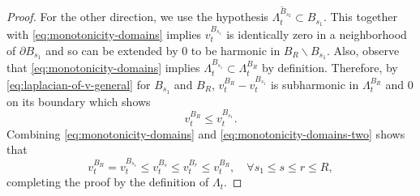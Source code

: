 \documentclass[12pt]{amsart}
\numberwithin{equation}{section}
\newcommand{\cluster}[2]{\hyperref[eq:non-co-set]{\mathit{\Lambda}^{#1}_{#2}}}
\newcommand{\odometer}[2]{\hyperref[eq:limit-odometer]{v^{#1}_{#2}}}
\begin{document}
\begin{proof}
		For the other direction, we use the hypothesis $\overline{\cluster{B_{s_2}}{t}} \subset B_{s_1}$. This together with \eqref{eq:monotonicity-domains}
		implies $\odometer{B_{s_1}}{t}$ is identically zero in a neighborhood of $\partial B_{s_1}$ and so can be extended
		by 0 to be harmonic in $B_R \backslash B_{s_1}$. Also, observe that \eqref{eq:monotonicity-domains} implies $\cluster{B_{s_1}}{t} \subset \cluster{B_R}{t}$ by definition.  Therefore, by \eqref{eq:laplacian-of-v-general} for $B_{s_1}$ and $B_R$, $\odometer{B_R}{t} - \odometer{B_{s_1}}{t}$ is subharmonic in $\cluster{B_R}{t}$ and 0 on its boundary
		which shows 
		\begin{equation} \label{eq:monotonicity-domains-two}
		\odometer{B_R}{t} \leq \odometer{B_{s_1}}{t}.
		\end{equation}
		Combining \eqref{eq:monotonicity-domains} and \eqref{eq:monotonicity-domains-two} shows that 
		\begin{equation}
		\odometer{B_{R}}{t} = \odometer{B_{s_1}}{t} \leq \odometer{B_{s}}{t} \leq \odometer{B_{r}}{t} \leq \odometer{B_R}{t}, \quad \forall s_1 \leq s \leq r \leq R,
		\end{equation}
		completing the proof by the definition of ${\cluster{}{t}}$. 
	\end{proof}
	
	
	
	
	
	
	
	
	
	
	
\end{document}
